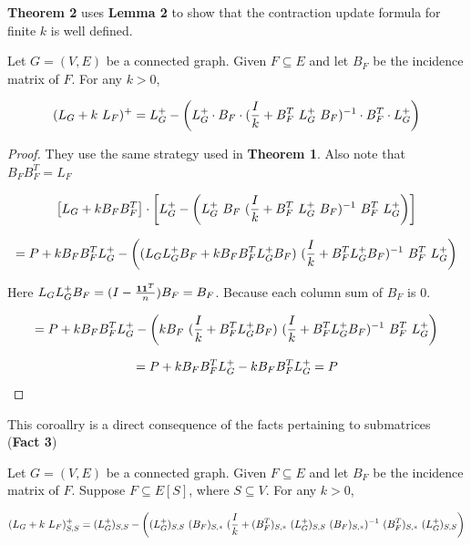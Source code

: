 \textbf{Theorem 2} uses \textbf{Lemma 2} to show that the contraction update formula for finite $k$ is well defined. 

\begin{HXt}
 Let $G = (V, E)$ be a connected graph. Given $F \subseteq E$ and let $B_F$ be the incidence matrix of $F$. For any $k > 0$,
 
 $$ (L_G + k \ L_F)^+ = \laplacian - \left(\laplacian \cdot B_F \cdot (\frac{I}{k} + B_F^T \ \laplacian \ B_F)^{-1} \cdot B_F^T \cdot \laplacian \right)$$
 
\end{HXt}

\begin{proof}
 They use the same strategy used in \textbf{Theorem 1}. Also note that $B_F B_F^T = L_F$
 
 $$\left[L_G + k B_F B_F^T \right] \cdot \left[\laplacian - \left(\laplacian \  B_F \  (\frac{I}{k} + B_F^T \ \laplacian \ B_F)^{-1} \  B_F^T \  \laplacian \right) \right]$$

 
$$= P + k B_F B_F^T L_{G}^{+} - \left( (L_GL_{G}^{+} B_F + kB_F B_F^T L_{G}^{+} B_F)\ (\frac{I}{k} + B_F^T L_{G}^{+} B_F)^{-1} \ B_F^T \ L_{G}^{+} \right)$$

Here $L_G L_{G}^{+} B_F = (I - \frac{\textbf{1} \textbf{1}^T}{n}) B_F = B_F$. Because each column sum of $B_F$ is 0.

$$ = P + k B_F B_F^T L_{G}^{+} - \left( k B_F \ (\frac{I}{k} + B_F^T L_{G}^{+} B_F) \ (\frac{I}{k} + B_F^T L_{G}^{+} B_F)^{-1} \ B_F^T \ L_{G}^{+} \right)$$ 

$$ = P + k B_F B_F^T L_{G}^{+} - k B_F B_F^T L_{G}^{+}  = P$$
 
 \end{proof}

This coroallry is a direct consequence of the facts pertaining to submatrices (\textbf{Fact 3})
\begin{HXc}
 Let $G = (V, E)$ be a connected graph. Given $F \subseteq E$ and let $B_F$ be the incidence matrix of $F$. Suppose $F \subseteq E[S]$, where $S \subseteq V$. For any $k > 0$,
 
  $$
  (L_G + k \ L_F)^+_{S,S} = (L_{G}^{+})_{S,S} -\left((L_{G}^{+})_{S,S} \  (B_F)_{S,*} \  (\frac{I}{k} + (B_F^T)_{S,*} \ (L_{G}^{+})_{S,S} \ (B_F)_{S,*})^{-1} \   (B_F^T)_{S,*} \  (L_{G}^{+} )_{S,S} \right)
 $$

\end{HXc}

